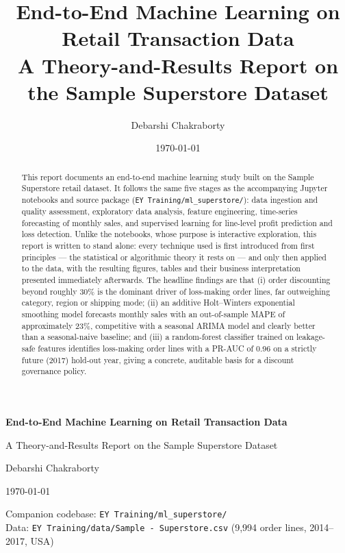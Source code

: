 \documentclass[11pt]{report}
\title{\textbf{End-to-End Machine Learning on Retail Transaction Data}\\[0.3em]
       \large A Theory-and-Results Report on the Sample Superstore Dataset}
\author{Debarshi Chakraborty}
\date{\today}
\begin{document}
\begin{titlepage}
  \centering
  \vspace*{2cm}
  {\Huge\bfseries End-to-End Machine Learning on Retail Transaction Data\par}
  \vspace{0.6cm}
  {\Large A Theory-and-Results Report on the Sample Superstore Dataset\par}
  \vspace{2cm}
  {\large Debarshi Chakraborty\par}
  \vspace{0.3cm}
  {\large \today\par}
  \vfill
  {\large
    Companion codebase: \texttt{EY Training/ml\_superstore/}\\
    Data: \texttt{EY Training/data/Sample - Superstore.csv} (9{,}994 order lines, 2014--2017, USA)
  \par}
  \vspace{1cm}
\end{titlepage}

\begin{abstract}
\noindent
This report documents an end-to-end machine learning study built on the
Sample Superstore retail dataset. It follows the same five stages as the
accompanying Jupyter notebooks and source package
(\texttt{EY Training/ml\_superstore/}): data ingestion and quality
assessment, exploratory data analysis, feature engineering, time-series
forecasting of monthly sales, and supervised learning for line-level profit
prediction and loss detection. Unlike the notebooks, whose purpose is
interactive exploration, this report is written to stand alone: every
technique used is first introduced from first principles --- the statistical
or algorithmic theory it rests on --- and only then applied to the data,
with the resulting figures, tables and their business interpretation
presented immediately afterwards. The headline findings are that (i) order
discounting beyond roughly 30\% is the dominant driver of loss-making order
lines, far outweighing category, region or shipping mode; (ii) an additive
Holt--Winters exponential smoothing model forecasts monthly sales with an
out-of-sample MAPE of approximately 23\%, competitive with a seasonal
ARIMA model and clearly better than a seasonal-naive baseline; and (iii) a
random-forest classifier trained on leakage-safe features identifies
loss-making order lines with a PR-AUC of 0.96 on a strictly future
(2017) hold-out year, giving a concrete, auditable basis for a discount
governance policy.
\end{abstract}

\tableofcontents
\listoffigures
\listoftables

\clearpage
{}







\end{document}
